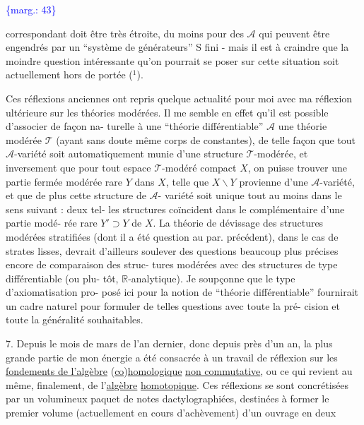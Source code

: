 \documentclass[11pt]{article}
\newcommand{\scanpage}[1]{\par\bigskip\noindent{\small\sffamily[scan #1]}\par}
\newcommand{\mspage}[1]{{\small\sffamily[p.\,#1]}}
\newcommand{\margin}[1]{\textcolor{blue}{\{\textsf{marg.:} #1\}}}
\newcommand{\uline}[1]{\underline{#1}}
\begin{document}
\margin{43}

\clearpage
\scanpage{119/44}
\mspage{42}

correspondant doit être très étroite, du moins pour des $\mathcal{A}$ qui
peuvent être engendrés par un ``système de générateurs'' S fini -
mais il est à craindre que la moindre question intéressante qu'on
pourrait se poser sur cette situation soit actuellement hors de
portée ($^1$).

Ces réflexions anciennes ont repris quelque actualité
pour moi avec ma réflexion ultérieure sur les théories modérées.
Il me semble en effet qu'il est possible d'associer de façon na-%
turelle à une ``théorie différentiable'' $\mathcal{A}$ une théorie modérée $\mathcal{T}$
(ayant sans doute même corps de constantes), de telle façon que
tout $\mathcal{A}$-variété soit automatiquement munie d'une structure $\mathcal{T}$-modérée,
et inversement que pour tout espace $\mathcal{T}$-modéré compact $X$, on puisse
trouver une partie fermée modérée rare $Y$ dans $X$, telle que $X \smallsetminus Y$
provienne d'une $\mathcal{A}$-variété, et que de plus cette structure de $\mathcal{A}$-%
variété soit unique tout au moins dans le sens suivant : deux tel-%
les structures coïncident dans le complémentaire d'une partie modé-%
rée rare $Y' \supset Y$ de $X$. La théorie de dévissage des structures
modérées stratifiées (dont il a été question au par. précédent),
dans le cas de strates lisses, devrait d'ailleurs soulever des
questions beaucoup plus précises encore de comparaison des struc-%
tures modérées avec des structures de type différentiable (ou plu-%
tôt, $\mathbb{R}$-analytique). Je soupçonne que le type d'axiomatisation pro-%
posé ici pour la notion de ``théorie différentiable'' fournirait un
cadre naturel pour formuler de telles questions avec toute la pré-%
cision et toute la généralité souhaitables.


7. Depuis le mois de mars de l'an dernier, donc depuis près
d'un an, la plus grande partie de mon énergie a été consacrée à un
travail de réflexion sur les \uline{fondements de l'algèbre} (\uline{co})\uline{homologique}
\uline{non commutative}, ou ce qui revient au même, finalement, de l'\uline{algèbre}
\uline{homotopique}. Ces réflexions se sont concrétisées par un volumineux
paquet de notes dactylographiées, destinées à former le premier
volume (actuellement en cours d'achèvement) d'un ouvrage en deux
\end{document}
